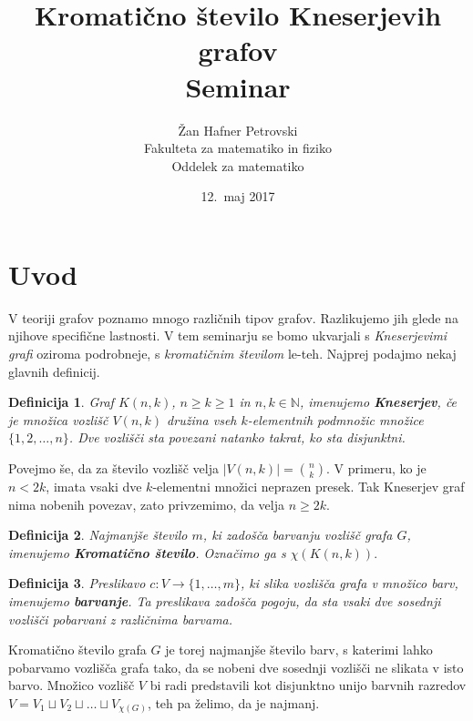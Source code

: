 \documentclass[a4paper,12pt]{article}
\title{Kromatično število Kneserjevih grafov \\ 
\Large Seminar}
\author{Žan Hafner Petrovski \\
Fakulteta za matematiko in fiziko \\
Oddelek za matematiko}
\date{12.\ maj 2017}
\newtheorem{definicija}{Definicija}
\begin{document}
 
\maketitle
\newpage


\section{Uvod}

V teoriji grafov poznamo mnogo različnih tipov grafov. Razlikujemo jih glede na njihove specifične lastnosti. V tem seminarju se bomo ukvarjali s {\em Kneserjevimi grafi} oziroma podrobneje, s {\em kromatičnim številom} le-teh. Najprej podajmo nekaj glavnih definicij.


\begin{definicija}
Graf $K(n,k)$, $n \geq k \geq 1$ in $n, k \in \mathbb{N}$, imenujemo \mbox{\textbf{Kneserjev}}, če je množica vozlišč $V(n,k)$ družina vseh $k$-elementnih podmnožic množice $\{1, 2, \ldots, n\}$. Dve vozlišči sta povezani natanko takrat, ko sta disjunktni. 
\end{definicija}

Povejmo še, da za število vozlišč velja $|V(n,k)|={{n}\choose{k}}$. V primeru, ko je $n < 2k$, imata vsaki dve $k$-elementni množici neprazen presek. Tak Kneserjev graf nima nobenih povezav, zato privzemimo, da velja $n \geq 2k$.


\begin{definicija}
Najmanjše število $m$, ki zadošča barvanju vozlišč grafa $G$, imenujemo \textbf {Kromatično število}. Označimo ga s $\chi(K(n,k)).$
\end{definicija}

\begin{definicija}
Preslikavo $c: V \rightarrow \{1, \ldots, m\}$, ki slika vozlišča grafa v množico barv, imenujemo \textbf {barvanje}. Ta preslikava zadošča pogoju, da sta vsaki dve sosednji vozlišči pobarvani z različnima barvama.
\end{definicija}

Kromatično število grafa $G$ je torej najmanjše število barv, s katerimi lahko pobarvamo vozlišča grafa tako, da se nobeni dve sosednji vozlišči ne slikata v isto barvo. Množico vozlišč $V$ bi radi predstavili kot disjunktno unijo barvnih razredov $V = V_1 \sqcup V_2 \sqcup \ldots \sqcup V_{\chi(G)}$, teh pa želimo, da je najmanj. 
\end{document}
